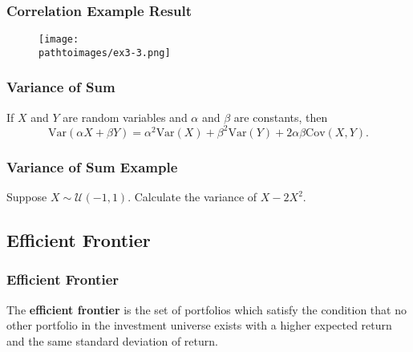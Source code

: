 \documentclass{beamer}
\newcommand{\pathtoimages}{/Users/charlesrambo/Desktop/Bootcamp24/Images}
\begin{document}
\begin{frame}[fragile]
\frametitle{Correlation Example Result}
\begin{figure}
\centering
\texttt{[image: \\pathtoimages/ex3-3.png]}
\end{figure}

\end{frame}


\begin{frame}
\frametitle{Variance of Sum}

\begin{Theorem}
If $X$ and $Y$ are random variables and $\alpha$ and $\beta$ are constants, then
$$
\text{Var}(\alpha X + \beta Y) = \alpha^2 \text{Var}(X) + \beta^2\text{Var}(Y) + 2\alpha\beta \text{Cov}(X, Y).
$$
\end{Theorem}
\end{frame}

\begin{frame}[t]
\frametitle{Variance of Sum Example}
\begin{Example}
Suppose $X\sim{\mathcal{U}(-1, 1)}$. Calculate the variance of $X - 2 X^2$.
\end{Example}

\end{frame}

\subsection{Efficient Frontier}

\begin{frame}
\frametitle{Efficient Frontier}

\begin{Definition}
The {\bf efficient frontier} is the set of portfolios which satisfy the condition that no other portfolio in the investment universe exists with a higher expected return and the same standard deviation of return.
\end{Definition}
\begin{figure}
\centering
{}
\end{figure}
\end{frame}
\end{document}
